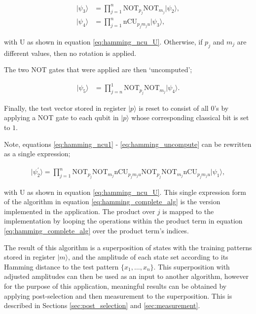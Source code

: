 \begin{align}
    \vert \psi_3 \rangle &=  \prod\limits_{j=1}^{n} \textrm{NOT}_{p_j}\textrm{NOT}_{m_j} \vert \psi_2 \rangle,\\
    \vert \psi_4 \rangle &=  \prod\limits_{j=1}^{n} \textrm{nCU}_{p_j m_j u} \vert \psi_3 \rangle , 
\end{align}

\noindent with \textrm{U} as shown in equation \eqref{eq:hamming_ncu_U}. Otherwise, if $p_j$ and $m_j$ are different values, then no rotation is applied. 

The two \textrm{NOT} gates that were applied are then `uncomputed';

\begin{align}
    \vert \psi_5 \rangle &=  \prod\limits_{j=n}^{1} \textrm{NOT}_{p_j}\textrm{NOT}_{m_j} \vert \psi_4 \rangle.
    \label{eq:hamming_uncompute}
\end{align}

Finally, the test vector stored in register $\vert p \rangle$ is reset to consist of all $0$'s by applying a \textrm{NOT} gate to each qubit in $\vert p \rangle$ whose corresponding classical bit is set to $1$.

Note, equations \eqref{eq:hamming_ncu1} - \eqref{eq:hamming_uncompute} can be rewritten as a single expression;

\begin{align}
    \label{eq:hamming_complete_alg}
    \vert \psi_2^{\prime} \rangle = \prod\limits_{j=1}^{n} \textrm{NOT}_{p_j}\textrm{NOT}_{m_j}  \textrm{nCU}_{p_j m_j u} \textrm{NOT}_{p_j}\textrm{NOT}_{m_j} \textrm{nCU}_{p_j m_j u} \vert \psi_1 \rangle,
\end{align}

\noindent with \textrm{U} as shown in equation \eqref{eq:hamming_ncu_U}. This single expression form of the algorithm in equation \eqref{eq:hamming_complete_alg} is the version implemented in the application. The product over $j$ is mapped to the implementation by looping the operations within the product term in equation \eqref{eq:hamming_complete_alg} over the product term's indices. 

The result of this algorithm is a superposition of states with the training patterns stored in register $\vert m \rangle$, and the amplitude of each state set according to its Hamming distance to the test pattern $\{x_1,\dots,x_n\}$. This superposition with adjusted amplitudes can then be used as an input to another algorithm, however for the purpose of this application, meaningful results can be obtained by applying post-selection and then measurement to the superposition. This is described in Sections \ref{sec:post_selection} and \ref{sec:measurement}.


